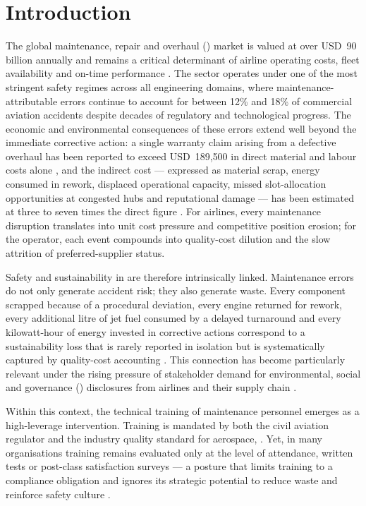 \section{Introduction}
\label{sec:introduction}

The global maintenance, repair and overhaul (\MRO{}) market is valued at over
USD~90 billion annually and remains a critical determinant of airline
operating costs, fleet availability and on-time performance
\citep{Zhang2025,Boyd2015}. The sector operates under one of the most
stringent safety regimes across all engineering domains, where
maintenance-attributable errors continue to account for between 12\% and 18\%
of commercial aviation accidents \citep{Boyd2015,FAA2024} despite decades of
regulatory and technological progress. The economic and environmental
consequences of these errors extend well beyond the immediate corrective
action: a single warranty claim arising from a defective overhaul has been
reported to exceed USD~189{,}500 in direct material and labour costs alone
\citep{Pereira2017}, and the indirect cost --- expressed as material scrap,
energy consumed in rework, displaced operational capacity, missed
slot-allocation opportunities at congested hubs and reputational damage ---
has been estimated at three to seven times the direct figure
\citep{Zhang2025}. For airlines, every maintenance disruption translates into
unit cost pressure and competitive position erosion; for the \MRO{} operator,
each event compounds into quality-cost dilution and the slow attrition of
preferred-supplier status.

Safety and sustainability in \MRO{} are therefore intrinsically linked.
Maintenance errors do not only generate accident risk; they also generate
waste. Every component scrapped because of a procedural deviation, every
engine returned for rework, every additional litre of jet fuel consumed by a
delayed turnaround and every kilowatt-hour of energy invested in corrective
actions correspond to a sustainability loss that is rarely reported in
isolation but is systematically captured by quality-cost accounting
\citep{Chen2023,Yang2024}. This connection has become particularly relevant
under the rising pressure of stakeholder demand for environmental, social and
governance (\ESG{}) disclosures from airlines and their supply chain
\citep{Sousa2025}.

Within this context, the technical training of maintenance personnel emerges
as a high-leverage intervention. Training is mandated by both the civil
aviation regulator \citep[\FAA{}, \EASA{}, \ANAC{} and other authorities
under \ICAO{} Annex 19;][]{FAA2024,EASA2025} and the industry quality
standard for aerospace, \AS{} \citep{Oschman2017}. Yet, in many
organisations training remains evaluated only at the level of attendance,
written tests or post-class satisfaction surveys --- a posture that limits
training to a compliance obligation and ignores its strategic potential to
reduce waste and reinforce safety culture
\citep{ORconnor2024,Nakamura2024}.

